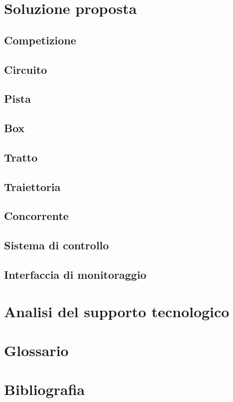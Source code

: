 \documentclass[a4paper]{book}
\begin{document}
\chapter{Soluzione proposta}

\section{Competizione}
\section{Circuito}
\section{Pista}
\section{Box}
\section{Tratto}
\section{Traiettoria}
\section{Concorrente}
\section{Sistema di controllo}
\section{Interfaccia di monitoraggio}
\chapter{Analisi del supporto tecnologico}

\chapter{Glossario}
\chapter{Bibliografia}
\end{document}
